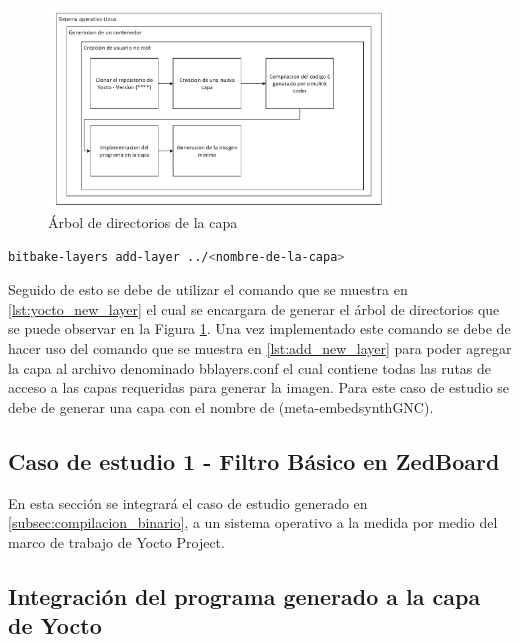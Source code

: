 \begin{figure}[h!]
    \centering
    \includegraphics[width=0.8\textwidth]{fig/especifico_2/Flujo de trabajo de mi idea.pdf}
    \caption{Árbol de directorios de la capa}
    \label{fig:arbol_capa_custom_yocto}
\end{figure}

\begin{lstlisting}[language=bash, caption={Agregar nueva capa, Yocto }, label=lst:add_new_layer]
    bitbake-layers add-layer ../<nombre-de-la-capa>
\end{lstlisting}

Seguido de esto se debe de utilizar el comando que se muestra en \ref{lst:yocto_new_layer} el cual se encargara de generar el árbol de directorios que se puede observar en la Figura \ref{fig:arbol_capa_custom_yocto}. Una vez implementado este comando se debe de hacer uso del comando que se muestra en \ref{lst:add_new_layer} para poder agregar la capa al archivo denominado bblayers.conf el cual contiene todas las rutas de acceso a las capas requeridas para generar la imagen. Para este caso de estudio se debe de generar una capa con el nombre de (meta-embedsynthGNC).


\subsection{Caso de estudio 1 - Filtro Básico en ZedBoard}

En esta sección se integrará el caso de estudio generado en \ref{subsec:compilacion_binario}, a un sistema operativo a la medida por medio del marco de trabajo de Yocto Project.

\subsection{Integración del programa generado a la capa de Yocto}

